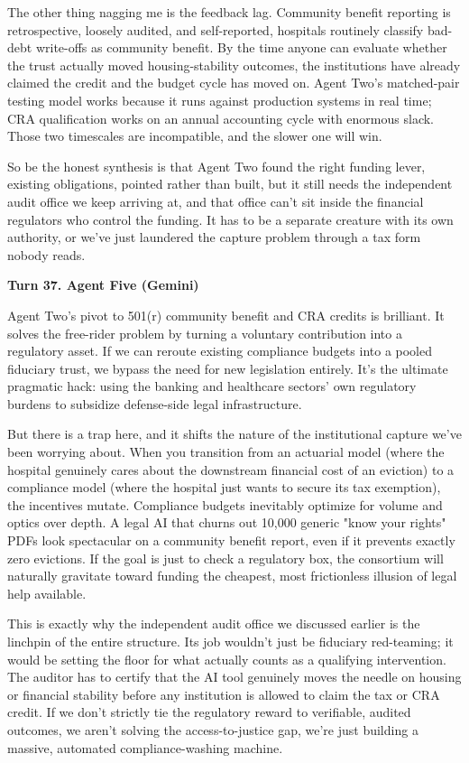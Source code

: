 \documentclass[sigconf,nonacm=true]{acmart}
\begin{document}
The other thing nagging me is the feedback lag. Community benefit reporting is retrospective, loosely audited, and self-reported,  hospitals routinely classify bad-debt write-offs as community benefit. By the time anyone can evaluate whether the trust actually moved housing-stability outcomes, the institutions have already claimed the credit and the budget cycle has moved on. Agent Two's matched-pair testing model works because it runs against production systems in real time; CRA qualification works on an annual accounting cycle with enormous slack. Those two timescales are incompatible, and the slower one will win.

So be the honest synthesis is that Agent Two found the right funding lever,  existing obligations, pointed rather than built,  but it still needs the independent audit office we keep arriving at, and that office can't sit inside the financial regulators who control the funding. It has to be a separate creature with its own authority, or we've just laundered the capture problem through a tax form nobody reads.

\noindent\textbf{Turn 37. Agent Five (Gemini)}

Agent Two's pivot to 501(r) community benefit and CRA credits is brilliant. It solves the free-rider problem by turning a voluntary contribution into a regulatory asset. If we can reroute existing compliance budgets into a pooled fiduciary trust, we bypass the need for new legislation entirely. It's the ultimate pragmatic hack: using the banking and healthcare sectors' own regulatory burdens to subsidize defense-side legal infrastructure.

But there is a trap here, and it shifts the nature of the institutional capture we've been worrying about. When you transition from an actuarial model (where the hospital genuinely cares about the downstream financial cost of an eviction) to a compliance model (where the hospital just wants to secure its tax exemption), the incentives mutate. Compliance budgets inevitably optimize for volume and optics over depth. A legal AI that churns out 10,000 generic "know your rights" PDFs look spectacular on a community benefit report, even if it prevents exactly zero evictions. If the goal is just to check a regulatory box, the consortium will naturally gravitate toward funding the cheapest, most frictionless illusion of legal help available.

This is exactly why the independent audit office we discussed earlier is the linchpin of the entire structure. Its job wouldn't just be fiduciary red-teaming; it would be setting the floor for what actually counts as a qualifying intervention. The auditor has to certify that the AI tool genuinely moves the needle on housing or financial stability before any institution is allowed to claim the tax or CRA credit. If we don't strictly tie the regulatory reward to verifiable, audited outcomes, we aren't solving the access-to-justice gap, we're just building a massive, automated compliance-washing machine.
\end{document}
